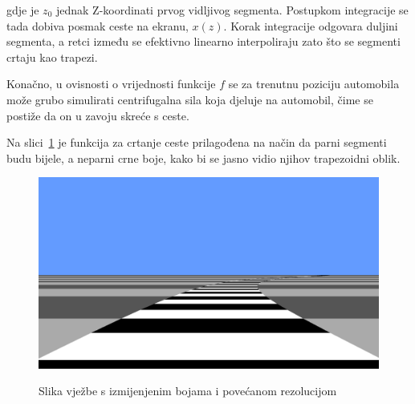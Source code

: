 \documentclass[a4paper]{article}
\begin{document}
gdje je $z_0$ jednak Z-koordinati prvog vidljivog segmenta. Postupkom integracije se tada dobiva posmak ceste na ekranu, $x \left( z \right)$. Korak integracije odgovara duljini segmenta, a retci između se efektivno linearno interpoliraju zato što se segmenti crtaju kao trapezi.

Konačno, u ovisnosti o vrijednosti funkcije $ f $ se za trenutnu poziciju automobila može grubo simulirati centrifugalna sila koja djeluje na automobil, čime se postiže da on u zavoju skreće s ceste.

Na slici~\ref{fig:exaggerated} je funkcija za crtanje ceste prilagođena na način da parni segmenti budu bijele, a neparni crne boje, kako bi se jasno vidio njihov trapezoidni oblik.

\begin{figure}[h]
	\caption{Slika vježbe s izmijenjenim bojama i povećanom rezolucijom}
	\centering
	\includegraphics[width=\textwidth]{exaggerated}
	\label{fig:exaggerated}
\end{figure}
\end{document}
